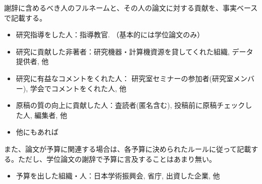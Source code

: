 謝辞に含めるべき人のフルネームと、その人の論文に対する貢献を、事実ベースで記載する。
\begin{itemize}
\item 研究指導をした人：指導教官. （基本的には学位論文のみ）
\item 研究に貢献した非著者：研究機器・計算機資源を貸してくれた組織, データ提供者, 他
\item 研究に有益なコメントをくれた人： 研究室セミナーの参加者(研究室メンバー), 学会でコメントをくれた人, 他
\item 原稿の質の向上に貢献した人：査読者(匿名含む), 投稿前に原稿チェックした人, 編集者, 他
\item 他にもあれば
\end{itemize}

また、論文が予算に関連する場合は、各予算に決められたルールに従って記載する。ただし、学位論文の謝辞で予算に言及することはあまり無い。
\begin{itemize}
\item 予算を出した組織・人：日本学術振興会, 省庁, 出資した企業, 他
\end{itemize}

